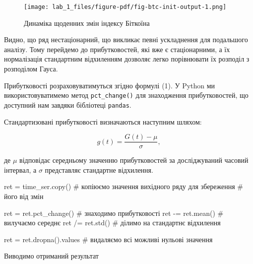 \documentclass[
  letterpaper,
]{report}
\newenvironment{Shaded}{\begin{snugshade}}{\end{snugshade}}
\newcommand{\CommentTok}[1]{\textcolor[rgb]{0.37,0.37,0.37}{#1}}
\newcommand{\NormalTok}[1]{\textcolor[rgb]{0.00,0.23,0.31}{#1}}
\newcommand{\OperatorTok}[1]{\textcolor[rgb]{0.37,0.37,0.37}{#1}}
\begin{document}
\begin{figure}[H]

{\centering \texttt{[image: lab\_1\_files/figure-pdf/fig-btc-init-output-1.png]}

}

\caption{\label{fig-btc-init}Динаміка щоденних змін індексу Біткоїна}

\end{figure}

Видно, що ряд нестаціонарний, що викликає певні ускладнення для
подальшого аналізу. Тому перейдемо до прибутковостей, які вже є
стаціонарними, а їх нормалізація стандартним відхиленням дозволяє легко
порівнювати їх розподіл з розподілом Гауса.

Прибутковості розраховуватимуться згідно формулі (1). У Python ми
використовуватимемо метод \texttt{pct\_change()} для знаходження
прибутковостей, що доступний нам завдяки бібліотеці \texttt{pandas}.

Стандартизовані прибутковості визначаються наступним шляхом:

\[
g(t) = \frac{G(t) - \mu}{\sigma},  
\]

де \(\mu\) відповідає середньому значенню прибутковостей за
досліджуваний часовий інтервал, а \(\sigma\) представляє стандартне
відхилення.

\begin{Shaded}
\begin{Highlighting}[]
\NormalTok{ret }\OperatorTok{=}\NormalTok{ time\_ser.copy()      }\CommentTok{\# копіюємо значення вихідного ряду для збереження }
                           \CommentTok{\# його від змін}

\NormalTok{ret }\OperatorTok{=}\NormalTok{ ret.pct\_change()     }\CommentTok{\# знаходимо прибутковості}
\NormalTok{ret }\OperatorTok{{-}=}\NormalTok{ ret.mean()          }\CommentTok{\# вилучаємо середнє }
\NormalTok{ret }\OperatorTok{/=}\NormalTok{ ret.std()           }\CommentTok{\# ділимо на стандартнє відхилення}

\NormalTok{ret }\OperatorTok{=}\NormalTok{ ret.dropna().values  }\CommentTok{\# видаляємо всі можливі нульові значення }
\end{Highlighting}
\end{Shaded}

Виводимо отриманий результат
\end{document}
